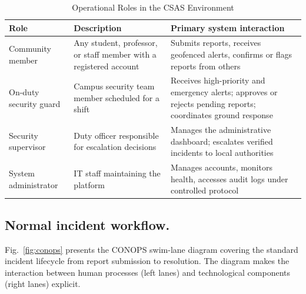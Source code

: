 \documentclass[12pt,a4paper]{article}
\begin{document}
\begin{table}[h]
\caption{Operational Roles in the CSAS Environment}
\label{tab:roles}
\centering
\begin{tabularx}{\textwidth}{lXX}
\toprule
\textbf{Role} & \textbf{Description} & \textbf{Primary system interaction} \\
\midrule
Community member & Any student, professor, or staff member with a registered account & Submits reports, receives geofenced alerts, confirms or flags reports from others \\
On-duty security guard & Campus security team member scheduled for a shift & Receives high-priority and emergency alerts; approves or rejects pending reports; coordinates ground response \\
Security supervisor & Duty officer responsible for escalation decisions & Manages the administrative dashboard; escalates verified incidents to local authorities \\
System administrator & IT staff maintaining the platform & Manages accounts, monitors health, accesses audit logs under controlled protocol \\
\bottomrule
\end{tabularx}
\end{table}

\subsection{Normal incident workflow.}
Fig.~\ref{fig:conops} presents the CONOPS swim-lane diagram covering
the standard incident lifecycle from report submission to resolution.
The diagram makes the interaction between human processes (left lanes)
and technological components (right lanes) explicit.
\end{document}
